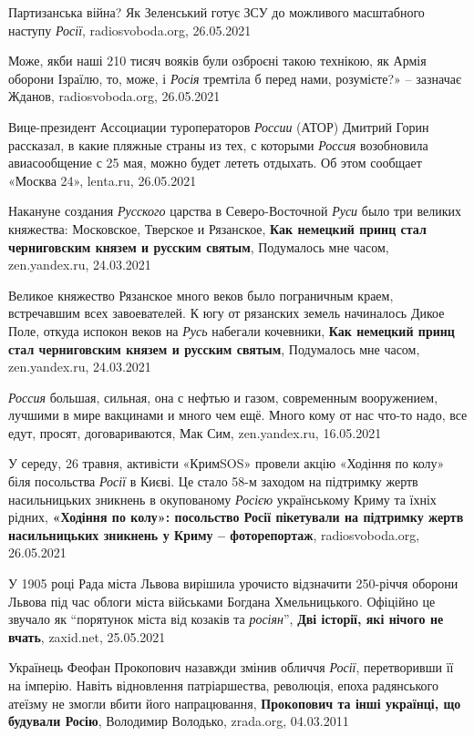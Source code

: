 Партизанська війна? Як Зеленський готує ЗСУ до можливого масштабного наступу
\emph{Росії}, radiosvoboda.org, 26.05.2021

Може, якби наші 210 тисяч вояків були озброєні такою технікою, як Армія оборони
Ізраїлю, то, може, і \emph{Росія} тремтіла б перед нами, розумієте?» – зазначає
Жданов, radiosvoboda.org, 26.05.2021

Вице-президент Ассоциации туроператоров \emph{России} (АТОР) Дмитрий Горин
рассказал, в какие пляжные страны из тех, с которыми \emph{Россия} возобновила
авиасообщение с 25 мая, можно будет лететь отдыхать. Об этом сообщает «Москва
24», lenta.ru, 26.05.2021

Накануне создания \emph{Русского} царства в Северо-Восточной \emph{Руси} было
три великих княжества: Московское, Тверское и Рязанское, \textbf{Как немецкий
принц стал черниговским князем и русским святым}, Подумалось мне часом,
zen.yandex.ru, 24.03.2021

Великое княжество Рязанское много веков было пограничным краем, встречавшим
всех завоевателей. К югу от рязанских земель начиналось Дикое Поле, откуда
испокон веков на \emph{Русь} набегали кочевники, \textbf{Как немецкий принц
стал черниговским князем и русским святым}, Подумалось мне часом,
zen.yandex.ru, 24.03.2021

\emph{Россия} большая, сильная, она с нефтью и газом, современным вооружением,
лучшими в мире вакцинами и много чем ещё. Много кому от нас что-то надо, все
едут, просят, договариваются, Мак Сим, zen.yandex.ru, 16.05.2021

У середу, 26 травня, активісти «КримSOS» провели акцію «Ходіння по колу» біля
посольства \emph{Росії} в Києві. Це стало 58-м заходом на підтримку жертв
насильницьких зникнень в окупованому \emph{Росією} українському Криму та їхніх рідних,
\textbf{«Ходіння по колу»: посольство Росії пікетували на підтримку жертв насильницьких зникнень у Криму – фоторепортаж},
radiosvoboda.org, 26.05.2021

У 1905 році Рада міста Львова вирішила урочисто відзначити 250-річчя оборони
Львова під час облоги міста військами Богдана Хмельницького. Офіційно це
звучало як \enquote{порятунок міста від козаків та \emph{росіян}}, \textbf{Дві
історії, які нічого не вчать}, zaxid.net, 25.05.2021

Українець Феофан Прокопович назавжди змінив обличчя \emph{Росії}, перетворивши
її на імперію. Навіть відновлення патріаршества, революція, епоха радянського
атеїзму не змогли вбити його напрацювання, \textbf{Прокопович та інші українці,
що будували Росію}, Володимир Володько, zrada.org, 04.03.2011

